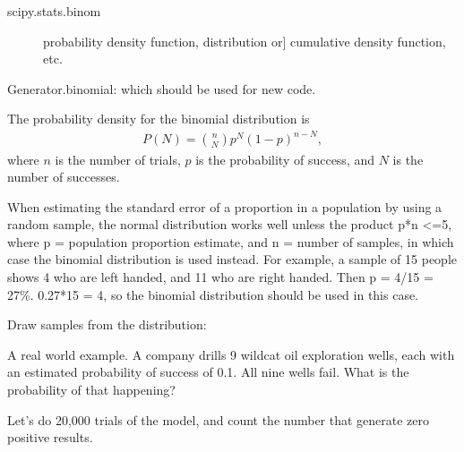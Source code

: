 \documentclass[letterpaper,10pt,english]{sphinxmanual}
\begin{document}
\begin{fulllineitems}
\begin{description}
\end{description}
\begin{description}
\item[{scipy.stats.binom}] \leavevmode{[}probability density function, distribution or{]}
cumulative density function, etc.

\end{description}

Generator.binomial: which should be used for new code.

The probability density for the binomial distribution is
\begin{equation*}
\begin{split}P(N) = \binom{n}{N}p^N(1-p)^{n-N},\end{split}
\end{equation*}
where \(n\) is the number of trials, \(p\) is the probability
of success, and \(N\) is the number of successes.

When estimating the standard error of a proportion in a population by
using a random sample, the normal distribution works well unless the
product p*n \textless{}=5, where p = population proportion estimate, and n =
number of samples, in which case the binomial distribution is used
instead. For example, a sample of 15 people shows 4 who are left
handed, and 11 who are right handed. Then p = 4/15 = 27\%. 0.27*15 = 4,
so the binomial distribution should be used in this case.

Draw samples from the distribution:

\begin{sphinxVerbatim}[commandchars=\\\{\}]
      
    
\end{sphinxVerbatim}

A real world example. A company drills 9 wild\sphinxhyphen{}cat oil exploration
wells, each with an estimated probability of success of 0.1. All nine
wells fail. What is the probability of that happening?

Let’s do 20,000 trials of the model, and count the number that
generate zero positive results.

\begin{sphinxVerbatim}[commandchars=\\\{\}]
    
\end{sphinxVerbatim}

\end{fulllineitems}
\end{document}
